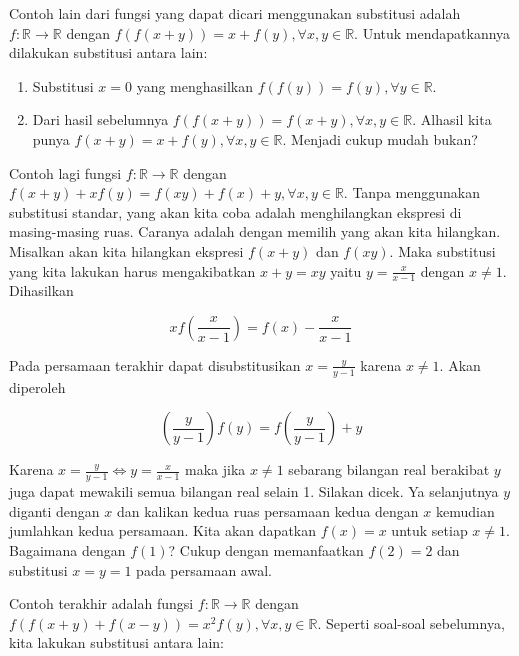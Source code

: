 \documentclass{article}
\begin{document}
Contoh lain dari fungsi yang dapat dicari menggunakan substitusi adalah $f : \mathbb{R} \rightarrow \mathbb{R}$ dengan $f(f(x+y)) = x + f(y), \forall x, y \in \mathbb{R}$. Untuk mendapatkannya dilakukan substitusi antara lain:
\begin{enumerate}
\item Substitusi $x = 0$ yang menghasilkan $f(f(y)) = f(y), \forall y \in \mathbb{R}$.
\item Dari hasil sebelumnya $f(f(x+y)) = f(x+y), \forall x, y \in \mathbb{R}$. Alhasil kita punya $f(x+y) = x + f(y), \forall x, y \in \mathbb{R}$. Menjadi cukup mudah bukan?
\end{enumerate}

Contoh lagi fungsi $f : \mathbb{R} \rightarrow \mathbb{R}$ dengan $f(x+y)+xf(y) = f(xy)+f(x)+y, \forall x, y \in \mathbb{R}$. Tanpa menggunakan substitusi standar, yang akan kita coba adalah menghilangkan ekspresi di masing-masing ruas. Caranya adalah dengan memilih yang akan kita hilangkan. Misalkan akan kita hilangkan ekspresi $f(x+y)$ dan $f(xy)$. Maka substitusi yang kita lakukan harus mengakibatkan $x+y = xy$ yaitu $y = \frac{x}{x-1}$ dengan $x \ne 1$. Dihasilkan


$$x f\left(\frac{x}{x-1}\right) = f(x) - \frac{x}{x-1}$$


Pada persamaan terakhir dapat disubstitusikan $x = \frac{y}{y-1}$ karena $x \ne 1$. Akan diperoleh


$$\left(\frac{y}{y-1}\right) f(y) = f\left(\frac{y}{y-1}\right) + y$$


Karena $x = \frac{y}{y-1} \iff y = \frac{x}{x-1}$ maka jika $x \ne 1$ sebarang bilangan real berakibat $y$ juga dapat mewakili semua bilangan real selain 1. Silakan dicek. Ya selanjutnya $y$ diganti dengan $x$ dan kalikan kedua ruas persamaan kedua dengan $x$ kemudian jumlahkan kedua persamaan. Kita akan dapatkan $f(x) = x$ untuk setiap $x \ne 1$. Bagaimana dengan $f(1)$? Cukup dengan memanfaatkan $f(2) = 2$ dan substitusi $x = y = 1$ pada persamaan awal.

Contoh terakhir adalah fungsi $f : \mathbb{R} \rightarrow \mathbb{R}$ dengan $f(f(x+y)+f(x-y)) = x^2 f(y), \forall x, y \in \mathbb{R}$. Seperti soal-soal sebelumnya, kita lakukan substitusi antara lain:
\end{document}
